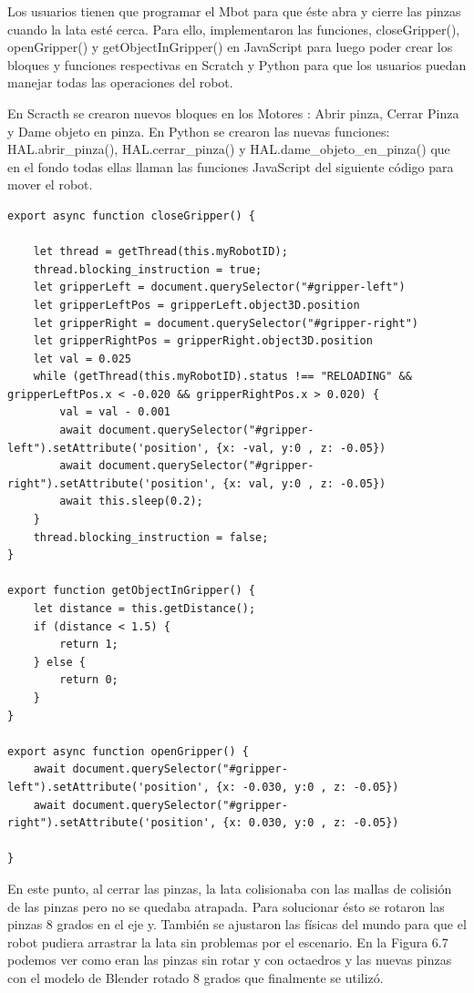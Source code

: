 Los usuarios tienen que programar el Mbot para que éste abra y cierre las pinzas cuando la lata esté cerca. Para ello, implementaron las funciones, closeGripper(), openGripper() y getObjectInGripper() en JavaScript para luego poder crear los bloques y funciones respectivas en Scratch y Python para que los usuarios puedan manejar todas las operaciones del robot. 
 
 En Scracth se crearon nuevos bloques en los Motores : Abrir pinza, Cerrar Pinza y Dame objeto en pinza.
 En Python  se crearon las nuevas funciones: HAL.abrir\_pinza(), HAL.cerrar\_pinza() y  HAL.dame\_objeto\_en\_pinza() que en el fondo todas ellas llaman las funciones JavaScript  del siguiente código para mover el robot.
 
\begin{lstlisting}
export async function closeGripper() {

    let thread = getThread(this.myRobotID);
    thread.blocking_instruction = true;
    let gripperLeft = document.querySelector("#gripper-left")
    let gripperLeftPos = gripperLeft.object3D.position
    let gripperRight = document.querySelector("#gripper-right")
    let gripperRightPos = gripperRight.object3D.position
    let val = 0.025
    while (getThread(this.myRobotID).status !== "RELOADING" && gripperLeftPos.x < -0.020 && gripperRightPos.x > 0.020) {
        val = val - 0.001
        await document.querySelector("#gripper-left").setAttribute('position', {x: -val, y:0 , z: -0.05})
        await document.querySelector("#gripper-right").setAttribute('position', {x: val, y:0 , z: -0.05})
        await this.sleep(0.2);
    }
    thread.blocking_instruction = false;
}

export function getObjectInGripper() {
    let distance = this.getDistance();
    if (distance < 1.5) {
        return 1;
    } else {
        return 0;
    }
}

export async function openGripper() {
    await document.querySelector("#gripper-left").setAttribute('position', {x: -0.030, y:0 , z: -0.05})
    await document.querySelector("#gripper-right").setAttribute('position', {x: 0.030, y:0 , z: -0.05})

}
\end{lstlisting}

 
En este punto, al cerrar las pinzas,  la lata colisionaba con las mallas de colisión de las pinzas pero no se quedaba atrapada. Para solucionar ésto se rotaron las pinzas 8 grados en el eje y. También se ajustaron las físicas del mundo para que el robot pudiera arrastrar la lata sin problemas por el escenario. En la Figura 6.7 podemos ver como eran las pinzas sin rotar y con octaedros y las nuevas pinzas con el modelo de Blender rotado 8 grados que finalmente se utilizó.


